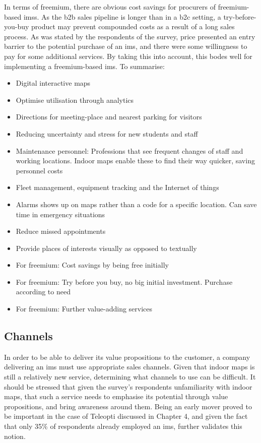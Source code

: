 In terms of freemium, there are obvious cost savings for procurers of freemium-based \glspl{ims}. As the \gls{b2b} sales pipeline is longer than in a \gls{b2c} setting, a try-before-you-buy product may prevent compounded costs as a result of a long sales process. As was stated by the respondents of the survey, price presented an entry barrier to the potential purchase of an \gls{ims}, and there were some willingness to pay for some additional services. By taking this into account, this bodes well for implementing a freemium-based \gls{ims}. To summarise:

\begin{itemize}
    \item Digital interactive maps
    \item Optimise utilisation through analytics
    \item Directions for meeting-place and nearest parking for visitors
    \item Reducing uncertainty and stress for new students and staff
    \item Maintenance personnel: Professions that see frequent changes of staff and working locations. Indoor maps enable these to find their way quicker, saving personnel costs
    \item Fleet management, equipment tracking and the Internet of things
    \item Alarms shows up on maps rather than a code for a specific location. Can save time in emergency situations
    \item Reduce missed appointments
    \item Provide places of interests visually as opposed to textually
    \item For freemium: Cost savings by being free initially
    \item For freemium: Try before you buy, no big initial investment. Purchase according to need
    \item For freemium: Further value-adding services
\end{itemize}
\newpage
\subsection{Channels}
In order to be able to deliver its value propositions to the customer, a company delivering an \gls{ims} must use appropriate sales channels. Given that indoor maps is still a relatively new service, determining what channels to use can be difficult. It should be stressed that given the survey's respondents unfamiliarity with indoor maps, that such a service needs to emphasise its potential through value propositions, and bring awareness around them. Being an early mover proved to be important in the case of Teleopti discussed in Chapter 4, and given the fact that only 35\% of respondents already employed an \gls{ims}, further validates this notion. 


